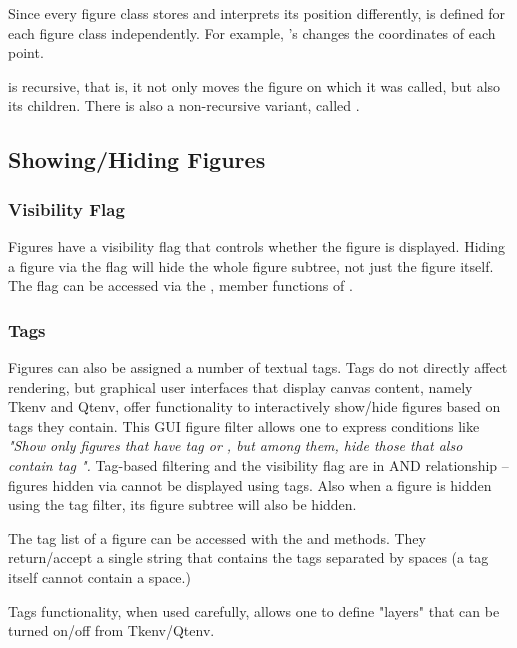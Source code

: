 Since every figure class stores and interprets its position differently,
 is defined for each figure class independently. For example,
's  changes the coordinates of each point.

 is recursive, that is, it not only moves the figure on which
it was called, but also its children. There is also a non-recursive variant,
called .


\subsection{Showing/Hiding Figures}

\subsubsection{Visibility Flag}

Figures have a visibility flag that controls whether the figure is
displayed. Hiding a figure via the flag will hide the whole figure subtree,
not just the figure itself. The flag can be accessed via the
,  member functions of
.


\subsubsection{Tags}

Figures can also be assigned a number of textual tags. Tags do not directly
affect rendering, but graphical user interfaces that display canvas
content, namely Tkenv and Qtenv, offer functionality to interactively
show/hide figures based on tags they contain. This GUI figure filter allows
one to express conditions like \textit{"Show only figures that have tag
 or , but among them, hide those that also contain
tag ".} Tag-based filtering and the visibility flag are in AND
relationship -- figures hidden via  cannot be
displayed using tags. Also when a figure is hidden using the tag filter,
its figure subtree will also be hidden.

The tag list of a figure can be accessed with the  and
  methods. They return/accept a single
string that contains the tags separated by spaces (a tag itself cannot
contain a space.)

Tags functionality, when used carefully, allows one to define "layers"
that can be turned on/off from Tkenv/Qtenv.

